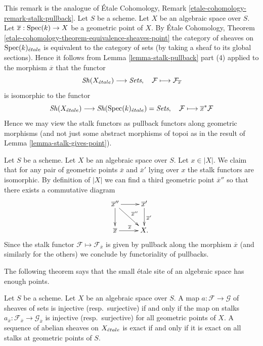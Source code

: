 \begin{remark}
\label{remark-stalk-pullback}
This remark is the analogue of
\'Etale Cohomology, Remark \ref{etale-cohomology-remark-stalk-pullback}.
Let $S$ be a scheme.
Let $X$ be an algebraic space over $S$.
Let $\overline{x} : \mathop{\mathrm{Spec}}(k) \to X$ be a geometric point of $X$.
By
\'Etale Cohomology,
Theorem \ref{etale-cohomology-theorem-equivalence-sheaves-point}
the category of sheaves on $\mathop{\mathrm{Spec}}(k)_{\acute{e}tale}$ is
equivalent to the category of sets (by taking a sheaf to its global sections).
Hence it follows from
Lemma \ref{lemma-stalk-pullback} part (4)
applied to the morphism $\overline{x}$ that the functor
$$
\mathop{\mathit{Sh}}\nolimits(X_{\acute{e}tale}) \longrightarrow \textit{Sets}, \quad
\mathcal{F} \longmapsto \mathcal{F}_{\overline{x}}
$$
is isomorphic to the functor
$$
\mathop{\mathit{Sh}}\nolimits(X_{\acute{e}tale})
\longrightarrow
\mathop{\mathit{Sh}}\nolimits(\mathop{\mathrm{Spec}}(k)_{\acute{e}tale}) = \textit{Sets},
\quad
\mathcal{F} \longmapsto \overline{x}^*\mathcal{F}
$$
Hence we may view the stalk functors as pullback functors along
geometric morphisms (and not just some abstract morphisms of topoi
as in the result of
Lemma \ref{lemma-stalk-gives-point}).
\end{remark}

\begin{remark}
\label{remark-map-stalks}
Let $S$ be a scheme.
Let $X$ be an algebraic space over $S$.
Let $x \in |X|$.
We claim that for any pair of geometric points $\overline{x}$ and
$\overline{x}'$ lying over $x$ the stalk functors are isomorphic.
By definition of $|X|$ we can find a third geometric point
$\overline{x}''$ so that there exists a commutative diagram
$$
\xymatrix{
\overline{x}'' \ar[r] \ar[d] \ar[rd]^{\overline{x}''} &
\overline{x}' \ar[d]^{\overline{x}'} \\
\overline{x} \ar[r]^{\overline{x}} & X.
}
$$
Since the stalk functor $\mathcal{F} \mapsto \mathcal{F}_{\overline{x}}$
is given by pullback along the morphism $\overline{x}$ (and similarly for
the others) we conclude by functoriality of pullbacks.
\end{remark}




\noindent
The following theorem says that the small \'etale site of an algebraic
space has enough points.

\begin{theorem}
\label{theorem-exactness-stalks}
Let $S$ be a scheme. Let $X$ be an algebraic space over $S$.
A map $a : \mathcal{F} \to \mathcal{G}$ of sheaves of sets is injective
(resp.\ surjective) if and only if the map on stalks
$a_{\overline{x}} : \mathcal{F}_{\overline{x}} \to \mathcal{G}_{\overline{x}}$
is injective (resp.\ surjective) for all geometric points of $X$.
A sequence of abelian sheaves on $X_{\acute{e}tale}$ is exact
if and only if it is exact on all stalks at geometric points of $S$.
\end{theorem}


